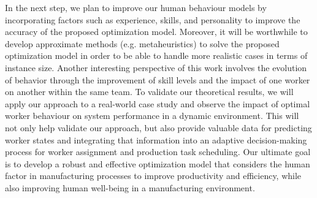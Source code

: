 \documentclass[review,12pt, 3p, times]{elsarticle}
\begin{document}

In the next step, we plan to improve our human behaviour models by incorporating factors such as experience, skills, and personality to improve the accuracy of the proposed optimization model.
Moreover, it will be worthwhile to develop approximate methods (e.g. metaheuristics) to solve the proposed optimization model in order to be able to handle more realistic cases in terms of instance size.
Another interesting perspective of this work involves the evolution of behavior through the improvement of skill levels and the impact of one worker on another within the same team.
To validate our theoretical results, we will apply our approach to a real-world case study and observe the impact of optimal worker behaviour on system performance in a dynamic environment. This will not only help validate our approach, but also provide valuable data for predicting worker states and integrating that information into an adaptive decision-making process for worker assignment and production task scheduling. 
Our ultimate goal is to develop a robust and effective optimization model that considers the human factor in manufacturing processes to improve productivity and efficiency, while also improving human well-being in a manufacturing environment.
	
\end{document}
